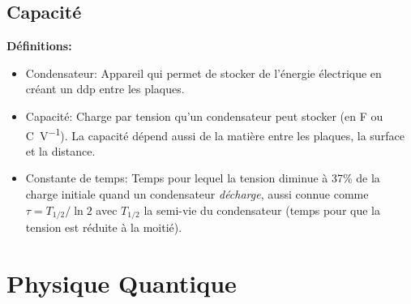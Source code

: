 \documentclass[french, a4paper, 12pt]{article}
\begin{document}
\subsection{Capacité}
\textbf{Définitions:}
\begin{itemize}
\item Condensateur: Appareil qui permet de stocker de l'énergie électrique en créant un ddp entre les plaques.
\item Capacité: Charge par tension qu'un condensateur peut stocker (en \si{\farad} ou \si{\coulomb\per\volt}). La capacité dépend aussi de la matière entre les plaques, la surface et la distance.
\item Constante de temps: Temps pour lequel la tension diminue à 37\% de la charge initiale quand un condensateur \emph{décharge}, aussi connue comme $\tau = T_{1/2}/\ln 2$ avec $T_{1/2}$ la \og semi-vie \fg{} du condensateur (temps pour que la tension est réduite à la moitié).
\end{itemize}
\pagebreak

\section{Physique Quantique}
\end{document}
